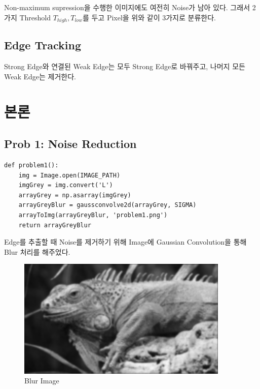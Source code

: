 \documentclass[]{report}
\begin{document}
Non-maximum supression을 수행한 이미지에도 여전히 Noise가 남아 있다. 그래서 2가지 Threshold $T_{high}, T_{low}$를 두고 Pixel을 위와 같이 3가지로 분류한다. \\

\section{Edge Tracking}

Strong Edge와 연결된 Weak Edge는 모두 Strong Edge로 바꿔주고, 나머지 모든 Weak Edge는 제거한다. \\



\chapter{본론}

\section*{Prob 1: Noise Reduction}

\begin{lstlisting}
def problem1():
	img = Image.open(IMAGE_PATH)
	imgGrey = img.convert('L')
	arrayGrey = np.asarray(imgGrey)
	arrayGreyBlur = gaussconvolve2d(arrayGrey, SIGMA)
	arrayToImg(arrayGreyBlur, 'problem1.png')
	return arrayGreyBlur
\end{lstlisting}

Edge를 추출할 때 Noise를 제거하기 위해 Image에 Gaussian Convolution을 통해 Blur 처리를 해주었다. \\

\begin{figure}[ht!]
	\centering
	\includegraphics[width=0.9\textwidth]{image/problem1.png}
	\caption{Blur Image}
	\label{problem1}
\end{figure}
\end{document}
